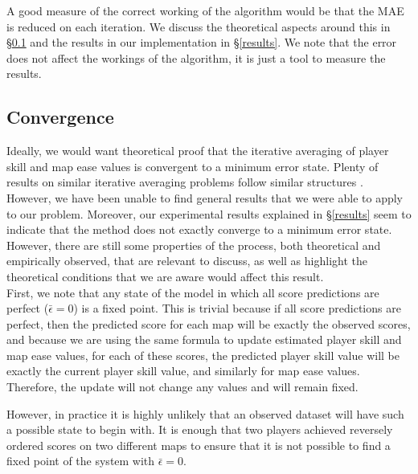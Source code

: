 \documentclass[12pt,a4paper]{article}
\begin{document}
A good measure of the correct working of the algorithm would be that the MAE is reduced on each iteration. We discuss the theoretical aspects around this in \S \ref{convergence} and the results in our implementation in \S \ref{results}. We note that the error does not affect the workings of the algorithm, it is just a tool to measure the results.

\subsection{Convergence}
\label{convergence}

Ideally, we would want theoretical proof that the iterative averaging of player skill and map ease values is convergent to a minimum error state. Plenty of results on similar iterative averaging problems follow similar structures \cite{convergence_speed_distributed_consensus,averaging_improve_convergence,average_convergence_iterative_projection,iterative_averaging_saddle_point_problems}. However, we have been unable to find general results that we were  able to apply to our problem. Moreover, our experimental results explained in \S \ref{results} seem to indicate that the method does not exactly converge to a minimum error state. However, there are still some properties of the process, both theoretical and empirically observed, that are relevant to discuss, as well as highlight the theoretical conditions that we are aware would affect this result.\\

First, we note that any state of the model in which all score predictions are perfect ($\bar{\epsilon} = 0$) is a fixed point. This is trivial because if all score predictions are perfect, then the predicted score for each map will be exactly the observed scores, and because we are using the same formula to update estimated player skill and map ease values, for each of these scores, the predicted player skill value will be exactly the current player skill value, and similarly for map ease values. Therefore, the update will not change any values and will remain fixed.

However, in practice it is highly unlikely that an observed dataset will have such a possible state to begin with. It is enough that two players achieved reversely ordered scores on two different maps to ensure that it is not possible to find a fixed point of the system with $\bar{\epsilon} = 0$.\\
\end{document}
